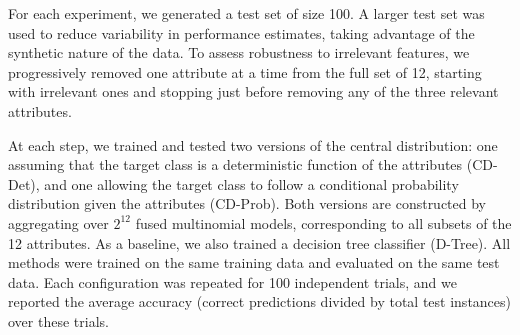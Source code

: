 For each experiment, we generated a test set of size 100.
A larger test set was used to reduce variability in performance estimates, taking advantage of the synthetic
nature of the data.
To assess robustness to irrelevant features, we progressively removed one attribute at a time from the full set
of 12, starting with irrelevant ones and stopping just before removing any of the three relevant attributes.

At each step, we trained and tested two versions of the central distribution: one assuming that the target class is
a deterministic function of the attributes (CD-Det), and one allowing the target class to follow a conditional
probability distribution given the attributes (CD-Prob).
Both versions are constructed by aggregating over $2^{12}$ fused multinomial models, corresponding to all subsets of
the 12 attributes.
As a baseline, we also trained a decision tree classifier (D-Tree).
All methods were trained on the same training data and evaluated on the same test data.
Each configuration was repeated for 100 independent trials, and we reported the average accuracy (correct
predictions divided by total test instances) over these trials.

